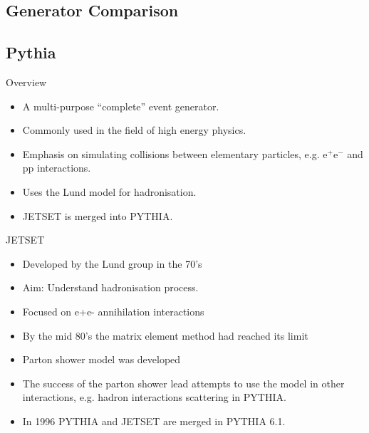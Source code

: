 \subsection{Generator Comparison}
\label{section: generator comparison}

%
%
%
%
%

\subsection*{Pythia}
Overview
\begin{itemize}
   \item A multi-purpose ``complete'' event generator.
   \item Commonly used in the field of high energy physics.
   \item Emphasis on simulating collisions between elementary particles, e.g. $\mathrm{e}^+\mathrm{e}^-$ and $\mathrm{pp}$ interactions.
   \item Uses the Lund model for hadronisation.
   \item JETSET is merged into PYTHIA.
\end{itemize}

JETSET
\begin{itemize}
  \item Developed by the Lund group in the 70's
  \item Aim: Understand hadronisation process.
  \item Focused on e+e- annihilation interactions
  \item By the mid 80's the matrix element method had reached its limit
  \item Parton shower model was developed
  \item The success of the parton shower lead attempts to use the model in other interactions, e.g. hadron interactions scattering in PYTHIA.
  \item In 1996 PYTHIA and JETSET are merged in PYTHIA 6.1.
\end{itemize}

